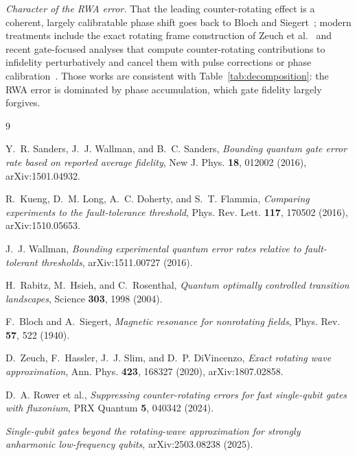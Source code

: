 \documentclass[11pt]{article}
\begin{document}
\emph{Character of the RWA error.}  That the leading counter-rotating effect
is a coherent, largely calibratable phase shift goes back to Bloch and
Siegert~\cite{BlochSiegert1940}; modern treatments include the exact rotating
frame construction of Zeuch et al.~\cite{Zeuch2020} and recent gate-focused
analyses that compute counter-rotating contributions to infidelity
perturbatively and cancel them with pulse corrections or phase
calibration~\cite{Rower2024, Fluxonium2025}.  Those works are consistent with
Table~\ref{tab:decomposition}: the RWA error is dominated by phase
accumulation, which gate fidelity largely forgives.

\begin{thebibliography}{9}

Y.~R. Sanders, J.~J. Wallman, and B.~C. Sanders,
\emph{Bounding quantum gate error rate based on reported average fidelity},
New J. Phys. \textbf{18}, 012002 (2016), arXiv:1501.04932.

R.~Kueng, D.~M. Long, A.~C. Doherty, and S.~T. Flammia,
\emph{Comparing experiments to the fault-tolerance threshold},
Phys. Rev. Lett. \textbf{117}, 170502 (2016), arXiv:1510.05653.

J.~J. Wallman,
\emph{Bounding experimental quantum error rates relative to fault-tolerant
thresholds}, arXiv:1511.00727 (2016).

H.~Rabitz, M.~Hsieh, and C.~Rosenthal,
\emph{Quantum optimally controlled transition landscapes},
Science \textbf{303}, 1998 (2004).

F.~Bloch and A.~Siegert,
\emph{Magnetic resonance for nonrotating fields},
Phys. Rev. \textbf{57}, 522 (1940).

D.~Zeuch, F.~Hassler, J.~J. Slim, and D.~P. DiVincenzo,
\emph{Exact rotating wave approximation},
Ann. Phys. \textbf{423}, 168327 (2020), arXiv:1807.02858.

D.~A. Rower et al.,
\emph{Suppressing counter-rotating errors for fast single-qubit gates with
fluxonium}, PRX Quantum \textbf{5}, 040342 (2024).

\emph{Single-qubit gates beyond the rotating-wave approximation for strongly
anharmonic low-frequency qubits}, arXiv:2503.08238 (2025).

\end{thebibliography}

\appendix
\end{document}
